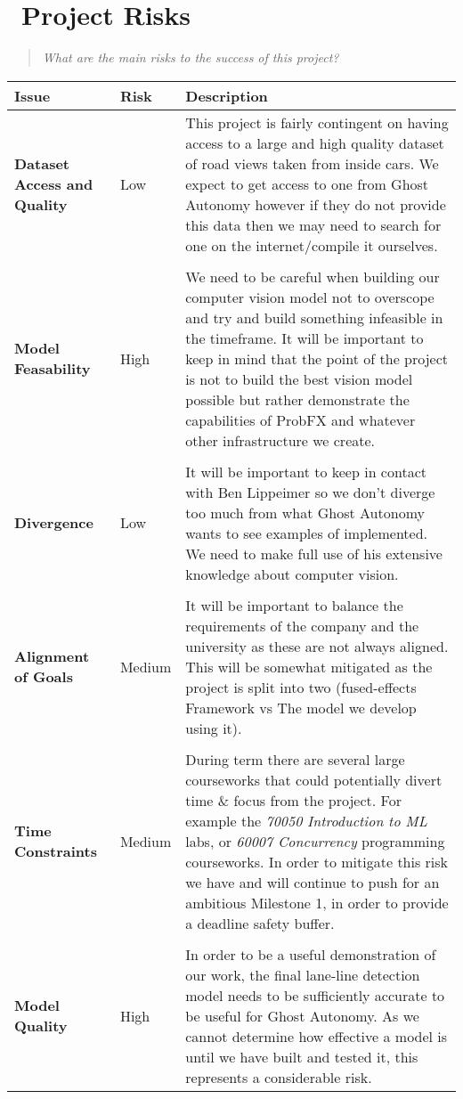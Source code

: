 \documentclass{report}
\newcommand{\teamq}[1]{\begin{quote}
    \large\textit{#1}
\end{quote}}
\begin{document}
\section*{\faExclamationTriangle \ Project Risks}
\teamq{What are the main risks to the success of this project?}

\begin{center}
    \begin{longtable}{p{} l p{}}
    \textbf{Issue} & \textbf{Risk} & \textbf{Description} \\
    \hline
    \textbf{Dataset Access and Quality} & Low & 
    This project is fairly contingent on having access to a large and high quality dataset of road views taken from inside cars. We expect to get access to one from Ghost Autonomy however if they do not provide this data then we may need to search for one on the internet/compile it ourselves. \\
    \\
    \textbf{Model Feasability} & High & 
    We need to be careful when building our computer vision model not to overscope and try and build something infeasible in the timeframe. It will be important to keep in mind that the point of the project is not to build the best vision model possible but rather demonstrate the capabilities of ProbFX and whatever other infrastructure we create. \\
    \\
    \textbf{Divergence} & Low & 
    It will be important to keep in contact with Ben Lippeimer so we don’t diverge too much from what Ghost Autonomy wants to see examples of implemented. We need to make full use of his extensive knowledge about computer vision. \\
    \\
    \textbf{Alignment \newline of Goals} & Medium & 
    It will be important to balance the requirements of the company and the university as these are not always aligned. This will be somewhat mitigated as the project is split into two (fused-effects Framework vs The model we develop using it). \\
    \\
    \textbf{Time \newline Constraints} & Medium &
    During term there are several large courseworks that could potentially divert time \& focus from the project. For example the \textit{70050 Introduction to ML} labs, or \textit{60007 Concurrency} programming courseworks. In order to mitigate this risk we have and will continue to push for an ambitious Milestone 1, in order to provide a deadline safety buffer. \\
    \\
    \textbf{Model \newline Quality} & High & In order to be a useful demonstration of our work, the final lane-line detection model needs to be sufficiently accurate to be useful for Ghost Autonomy. As we cannot determine how effective a model is until we have built and tested it, this represents a considerable risk. \\
    \end{longtable}
\end{center}
\end{document}
